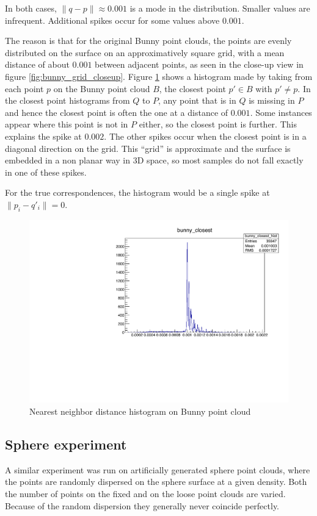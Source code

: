 In both cases, $\| q - p \| \approx 0.001$ is a mode in the distribution. Smaller values are infrequent. Additional spikes occur for some values above $0.001$. 

The reason is that for the original Bunny point clouds, the points are evenly distributed on the surface on an approximatively square grid, with a mean distance of about $0.001$ between adjacent points, as seen in the close-up view in figure \ref{fig:bunny_grid_closeup}. Figure \ref{fig:bunny_closest} shows a histogram made by taking from each point $p$ on the Bunny point cloud $B$, the closest point $p' \in B$ with $p' \neq p$. In the closest point histograms from $Q$ to $P$, any point that is in $Q$ is missing in $P$ and hence the closest point is often the one at a distance of $0.001$. Some instances appear where this point is not in $P$ either, so the closest point is further. This explains the spike at $0.002$. The other spikes occur when the closest point is in a diagonal direction on the grid. This ``grid'' is approximate and the surface is embedded in a non planar way in 3D space, so most samples do not fall exactly in one of these spikes.

For the true correspondences, the histogram would be a single spike at $\|p_i - q'_i\| = 0$. 

\begin{figure}[h]
\centering
\includegraphics[width=.5\linewidth]{fig/bunny_closest.pdf}
\caption{Nearest neighbor distance histogram on Bunny point cloud}
\label{fig:bunny_closest}
\end{figure}


\subsection{Sphere experiment}
A similar experiment was run on artificially generated sphere point clouds, where the points are randomly dispersed on the sphere surface at a given density. Both the number of points on the fixed and on the loose point clouds are varied. Because of the random dispersion they generally never coincide perfectly. 

